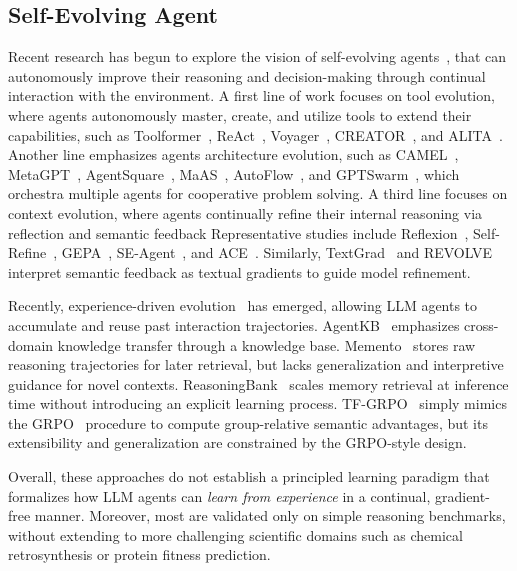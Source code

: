 \documentclass{article}
\begin{document}
\subsection{Self-Evolving Agent}
Recent research has begun to explore the vision of self-evolving agents~\cite{gao2025survey,fang2025comprehensive}, that can autonomously improve their reasoning and decision-making through continual interaction with the environment.
A first line of work focuses on tool evolution, where agents autonomously master, create, and utilize tools to extend their capabilities, such as Toolformer~\cite{schick2023toolformer}, ReAct~\cite{yao2022react}, Voyager~\cite{wang2023voyager}, CREATOR~\cite{qian2023creator}, and ALITA~\cite{qiu2025alita}.
Another line emphasizes agents architecture evolution, such as CAMEL~\cite{li2023camel}, MetaGPT~\cite{hong2023metagpt}, AgentSquare~\cite{shang2024agentsquare}, MaAS~\cite{zhang2025multi}, AutoFlow~\cite{li2024autoflow}, and GPTSwarm~\cite{zhuge2024gptswarm}, which orchestra multiple agents for cooperative problem solving.
A third line focuses on context evolution, where agents continually refine their internal reasoning via reflection and semantic feedback
Representative studies include Reflexion~\cite{shinn2023reflexion}, Self-Refine~\cite{madaan2023self}, GEPA~\cite{agrawal2025gepa}, SE-Agent~\cite{lin2025se}, and ACE~\cite{zhang2025agentic}.
Similarly, TextGrad~\cite{yuksekgonul2024textgrad} and REVOLVE~\cite{zhang2024revolve} interpret semantic feedback as textual gradients to guide model refinement.

Recently, experience-driven evolution~\cite{tang2025agent,zhou2025memento,ouyang2025reasoningbank,cai2025training} has emerged, allowing LLM agents to accumulate and reuse past interaction trajectories.
AgentKB~\cite{tang2025agent} emphasizes cross-domain knowledge transfer through a knowledge base. 
Memento~\cite{zhou2025memento} stores raw reasoning trajectories for later retrieval, but lacks generalization and interpretive guidance for novel contexts.
ReasoningBank~\cite{ouyang2025reasoningbank} scales memory retrieval at inference time without introducing an explicit learning process.
TF-GRPO~\cite{cai2025training} simply mimics the GRPO~\cite{shao2024deepseekmath} procedure to compute group-relative semantic advantages, but its extensibility and generalization are constrained by the GRPO-style design.

Overall, these approaches do not establish a principled learning paradigm that formalizes how LLM agents can \emph{learn from experience} in a continual, gradient-free manner. 
Moreover, most are validated only on simple reasoning benchmarks, without extending to more challenging scientific domains such as chemical retrosynthesis or protein fitness prediction.
\end{document}
